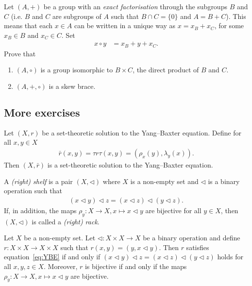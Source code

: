 \begin{exercise}\label{ex:ef}
        Let $(A,+)$ be a group with an \emph{exact factorisation} through the subgroups $B$ and $C$ (i.e. $B$ and $C$ are subgroups of $A$ such that $B\cap C=\{ 0\}$ and $A=B+C$). 
        This means that each $x\in A$ can be written in a unique way as $x=x_B+x_C$, for some $x_B\in B$ and $x_C\in C$.
        Set
        \begin{align*}
		    x\circ y&=x_B+y+x_C.
	    \end{align*}
        Prove that
        \begin{enumerate}
            \item $(A,\circ)$ is a group isomorphic to $B\times C$, the direct product of $B$ and $C$.
            \item $(A,+,\circ)$ is a  skew brace.
        \end{enumerate}
    \end{exercise}

\subsection{More exercises}\mbox{}

\begin{exercise}\label{ex:taurtau}
    Let $(X,r)$ be a set-theoretic solution to the Yang--Baxter equation. Define for all $x,y \in X$
    \begin{align*}
        \bar{r}(x,y) = \tau r \tau (x,y) = (\rho_x(y),\lambda_y(x)).
    \end{align*}
    Then $(X,\bar{r})$ is a set-theoretic solution to the Yang--Baxter equation.
\end{exercise}

A \emph{(right) shelf} is a pair $(X,\triangleleft)$ where $X$ is a non-empty set and $\triangleleft$ is a binary operation such that 
    \begin{align*}
        (x\triangleleft y)\triangleleft z=(x\triangleleft z)\triangleleft(y\triangleleft z).
    \end{align*}
    If, in addition, the maps $\rho_y:X \to X, x \mapsto x\triangleleft y$ are bijective for all $y\in X$, then $(X,\triangleleft)$ is called a \emph{(right) rack}.
    
\begin{exercise}\label{ex2}
     Let $X$ be a non-empty set.
     Let $\triangleleft: X\times X \to X$ be a binary operation and define $r: X\times X \to X\times X$ such that $r(x,y)= (y,x \triangleleft y)$. Then $r$ satisfies equation~\ref{eq:YBE} if and only if $(x\triangleleft y)\triangleleft z=(x\triangleleft z)\triangleleft(y\triangleleft z)$ holds for all $x,y,z \in X$. 
     Moreover, $r$ is bijective if and only if the maps $\rho_y:X\to X, x \mapsto x\triangleleft y$ are bijective.
\end{exercise}

